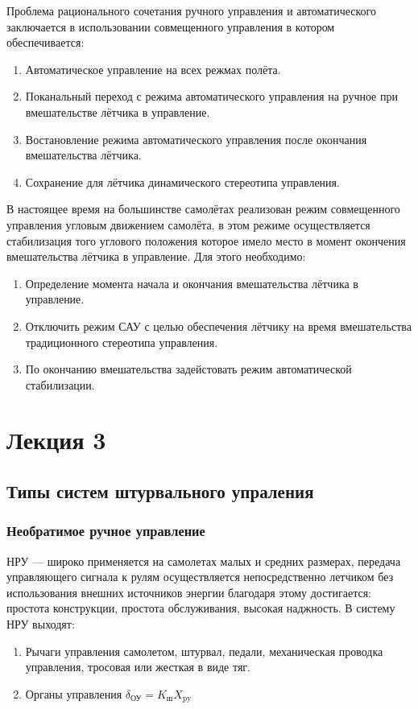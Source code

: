 \documentclass{article}
\begin{document}
Проблема рационального сочетания ручного управления и автоматического заключается в использовании совмещенного управления в котором обеспечивается: 
\begin{enumerate}
	\item Автоматическое управление на всех режмах полёта.
	\item Поканальный переход с режима автоматического управления на ручное при вмешательстве лётчика в управление.
	\item Востановление режима автоматического управления после окончания вмешательства лётчика.
	\item Сохранение для лётчика динамического стереотипа управления.
\end{enumerate}
В настоящее время на большинстве самолётах реализован режим совмещенного управления угловым движением самолёта, в этом режиме осуществляется стабилизация того углового положения которое имело место в момент окончения вмешательства лётчика в управление. 
Для этого необходимо:
\begin{enumerate}
	\item Определение момента начала и окончания вмешательства лётчика в управление.
	\item Отключить режим САУ с целью обеспечения лётчику на время вмешательства традиционного стереотипа управления.
	\item По окончанию вмешательства задейстовать режим автоматической стабилизации.
\end{enumerate}
\newpage

\section{Лекция 3}
\subsection{Типы систем штурвального упраления}
\subsubsection{Необратимое ручное управление}
НРУ --- широко применяется на самолетах малых и средних размерах, передача управляющего сигнала к рулям осуществляется непосредственно летчиком без использования внешних источников энергии благодаря этому достигается: простота конструкции, простота обслуживания, высокая наджность. 
В систему НРУ выходят:
\begin{enumerate}
	\item Рычаги управления самолетом, штурвал, педали, механическая проводка управления, тросовая или жесткая в виде тяг.
	\item Органы управления $\delta_\text{ОУ} = K_\text{ш} X_\text{py}$
\end{enumerate}
\end{document}
